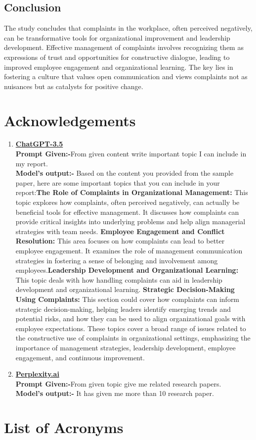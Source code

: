 \documentclass[runningheads]{llncs}
\begin{document}
\subsection{Conclusion}
The study concludes that complaints in the workplace, often perceived negatively, can be transformative tools for organizational improvement and leadership development. Effective management of complaints involves recognizing them as expressions of trust and opportunities for constructive dialogue, leading to improved employee engagement and organizational learning. The key lies in fostering a culture that values open communication and views complaints not as nuisances but as catalysts for positive change.
\newpage


\section*{Acknowledgements}
\begin{enumerate} 
    \item \textbf{\href{https://chat.openai.com/}{ChatGPT-3.5}}
\\     \textbf{Prompt Given:-}From given content write important topic I can include in my report.
    \\ \textbf{Model's output:-} 
        Based on the content you provided from the sample paper, here are some important topics that you can include in your report:\textbf{The Role of Complaints in Organizational Management:} This topic explores how complaints, often perceived negatively, can actually be beneficial tools for effective management. It discusses how complaints can provide critical insights into underlying problems and help align managerial strategies with team needs.
 \textbf{Employee Engagement and Conflict Resolution:} This area focuses on how complaints can lead to better employee engagement. It examines the role of management communication strategies in fostering a sense of belonging and involvement among employees.\textbf{Leadership Development and Organizational Learning:} This topic deals with how handling complaints can aid in leadership development and organizational learning. \textbf{Strategic Decision-Making Using Complaints:} This section could cover how complaints can inform strategic decision-making, helping leaders identify emerging trends and potential risks, and how they can be used to align organizational goals with employee expectations.
These topics cover a broad range of issues related to the constructive use of complaints in organizational settings, emphasizing the importance of management strategies, leadership development, employee engagement, and continuous improvement.
\item \textbf{\href{https://www.perplexity.ai/}{Perplexity.ai}}
\\ \textbf{Prompt Given:-}From given topic give me related research papers.
    \\ \textbf{Model's output:-} It has given me more than 10 research paper.
\end{enumerate}
\section*{List of Acronyms}
\begin{acronym}
\end{acronym}

\newpage

\end{document}
